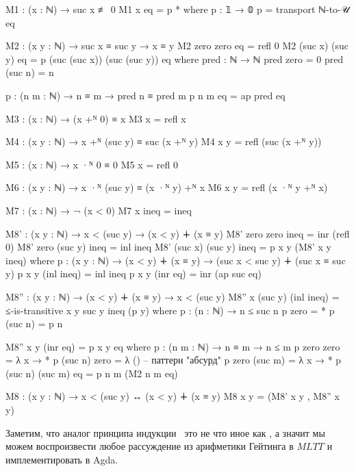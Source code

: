 \documentclass{article}[12pt]
\newcommand{\dash}{\textemdash\ }
\begin{document}
\begin{code}
M1 : (x : ℕ) → suc x ≢ 0
M1 x eq = p *
    where
        p : 𝟙 → 𝟘
        p = transport ℕ-to-𝒰 eq

M2 : (x y : ℕ) → suc x ≡ suc y → x ≡ y
M2 zero zero eq = refl 0
M2 (suc x) (suc y) eq = p (suc (suc x)) (suc (suc y)) eq
    where
        pred : ℕ → ℕ
        pred zero = 0
        pred (suc n) = n

        p : (n m : ℕ) → n ≡ m → pred n ≡ pred m
        p n m eq = ap pred eq

M3 : (x : ℕ) → (x +ᴺ 0) ≡ x
M3 x = refl x

M4 : (x y : ℕ) → x +ᴺ (suc y) ≡ suc (x +ᴺ y)
M4 x y = refl (suc (x +ᴺ y))

M5 : (x : ℕ) → x ·ᴺ 0 ≡ 0
M5 x = refl 0

M6 : (x y : ℕ) → x ·ᴺ (suc y) ≡ (x ·ᴺ y) +ᴺ x
M6 x y = refl (x ·ᴺ y +ᴺ x)

M7 : (x : ℕ) → ¬ (x < 0)
M7 x ineq = ineq

M8' : (x y : ℕ) → x < (suc y) → (x < y) ∔ (x ≡ y)
M8' zero zero ineq = inr (refl 0)
M8' zero (suc y) ineq = inl ineq
M8' (suc x) (suc y) ineq = p x y (M8' x y ineq)
    where
        p : (x y : ℕ) → (x < y) ∔ (x ≡ y) → (suc x < suc y) ∔ (suc x ≡ suc y)
        p x y (inl ineq) = inl ineq
        p x y (inr eq) = inr (ap suc eq)

M8'' : (x y : ℕ) → (x < y) ∔ (x ≡ y) → x < (suc y)
M8'' x (suc y) (inl ineq) = ≤-is-transitive {x} {y} {suc y} ineq (p y)
    where
        p : (n : ℕ) → n ≤ suc n
        p zero = *
        p (suc n) = p n
        
M8'' x y (inr eq) = p x y eq
    where
        p : (n m : ℕ) → n ≡ m → n ≤ m
        p zero zero = λ x → *
        p (suc n) zero = λ () -- паттерн "абсурд"
        p zero (suc m) = λ x → *
        p (suc n) (suc m) eq = p n m (M2 n m eq)

M8 : (x y : ℕ) → x < (suc y) ↔ (x < y) ∔ (x ≡ y)
M8 x y = (M8' x y , M8'' x y)
\end{code}
Заметим, что аналог принципа индукции \dash это не что иное как , а значит
мы можем воспроизвести любое рассуждение из арифметики Гейтинга в $MLTT$ и имплементировать в Agda.
\end{document}
